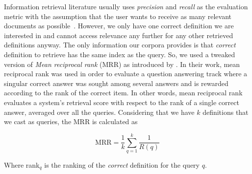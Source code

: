 Information retrieval literature usually uses \emph{precision} and \emph{recall} as the evaluation metric with the assumption that the user wants to receive as many relevant documents as possible~\cite{salton_state_1992}.
However, we only have one correct definition we are interested in and cannot access relevance any further for any other retrieved definitions anyway.
The only information our corpora provides is that \emph{correct} definition to retrieve has the same index as the query.
So, we used a tweaked version of \emph{Mean reciprocal rank} (MRR) as introduced by \textcite{voorhees_trec-8_1999}.
In their work, mean reciprocal rank was used in order to evaluate a question answering track where a singular correct answer was sought among several answers and is rewarded according to the rank of the correct item.
In other words, mean reciprocal rank evaluates a system's retrieval score with respect to the rank of a single correct answer, averaged over all the queries.
Considering that we have $k$ definitions that we cast as queries, the MRR is calculated as

\begin{equation}\label{eq:mrr}
    \text{MRR} = \frac{1}{k} \sum_{q = 1}^{k} \frac{1}{R(q)}
\end{equation}

Where rank$_q$ is the ranking of the \emph{correct} definition for the query $q$.

